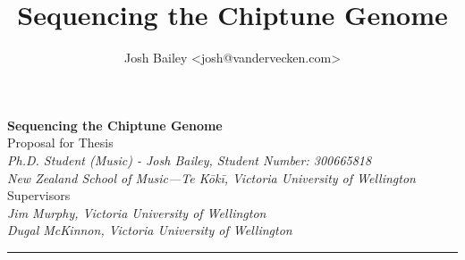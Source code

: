 \documentclass[10pt]{article}
\author{Josh Bailey <josh@vandervecken.com>}
\title{Sequencing the Chiptune Genome}
\begin{document}
        \begin{center}
          {\Large \textbf{Sequencing the Chiptune Genome}}\\
                \vspace{1em}
                Proposal for Thesis\\
                \vspace{1em}
                \textit{
                Ph.D. Student (Music) - Josh Bailey,
                Student Number: 300665818\\
                  New Zealand School of Music—Te Kōkī,
                  Victoria University of Wellington}\\
                \vspace{1em}
                Supervisors\\
                \vspace{1em}
                \textit{
                  Jim Murphy, Victoria University of Wellington\\
                  Dugal McKinnon, Victoria University of Wellington}\\
        \end{center}

        \begin{center}
                \rule{150mm}{0.2mm}
        \end{center}
\end{document}
